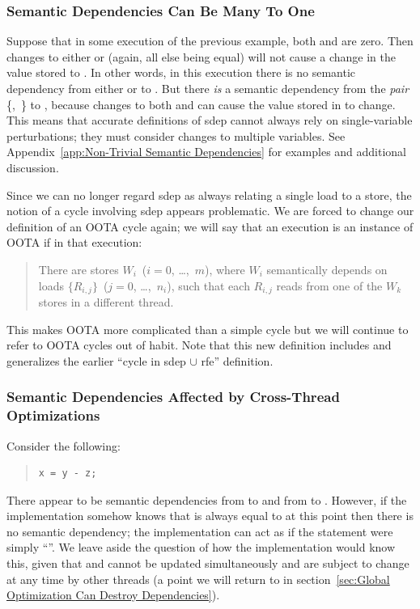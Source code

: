 \documentclass[10]{article}
\begin{document}
\subsubsection{Semantic Dependencies Can Be Many To One}
\label{sec:Semantic Dependencies Can Be Many To One}

Suppose that in some execution of the previous example,
both  and  are zero.
Then changes to either  or  (again, all
else being equal) will not cause a change in the value stored to .
In other words, in this execution there is no semantic dependency
from either  or  to .
But there \emph{is} a semantic dependency from the \emph{pair}
\{,~\} to ,
because changes to both  and 
can cause the value stored in  to change.
This means that accurate definitions of sdep cannot always rely on
single-variable perturbations;
they must consider changes to multiple variables.
See Appendix~\ref{app:Non-Trivial Semantic Dependencies}
for examples and additional discussion.

Since we can no longer regard sdep as always relating a single load to a store,
the notion of a cycle involving sdep appears problematic.
We are forced to change our definition of an OOTA cycle again;
we will say that an execution is an instance of OOTA if in that execution:
\begin{quote}
	There are stores
	$W_i$~($i = 0$, \ldots,~$m$),
	where $W_i$ semantically depends on loads
	$\{R_{i,j}\}$~($j = 0$, \ldots,~$n_i$),
	such that each $R_{i,j}$ reads from one of the $W_k$
	stores in a different thread.
\end{quote}
This makes OOTA more complicated than a simple cycle but
we will continue to refer to OOTA cycles out of habit.
Note that this new definition includes and generalizes the earlier
``cycle in sdep $\cup$ rfe'' definition.

\subsubsection{Semantic Dependencies Affected by Cross-Thread Optimizations}
\label{sec:Semantic Dependencies Affected by Cross-Thread Optimizations}

Consider the following:
\begin{quote}
\begin{verbatim}
x = y - z;
\end{verbatim}
\end{quote}
There appear to be semantic dependencies from  to  and from 
to .
However, if the implementation somehow knows that  is
always equal to  at this point then there is no semantic dependency;
the implementation can act as if the statement were simply ``''.
We leave aside the question of how the implementation would know this,
given that  and  cannot be updated simultaneously
and are subject to change at any time by
other threads (a point we will return to in
section~\ref{sec:Global Optimization Can Destroy Dependencies}).
\end{document}

